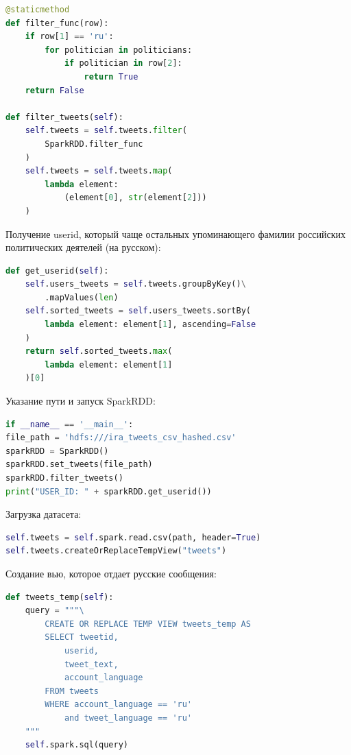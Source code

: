 \begin{lstlisting}[language={Python}, caption={Выбор сообщений}, label=lst:rdd2]
@staticmethod
def filter_func(row):
	if row[1] == 'ru':
		for politician in politicians:
			if politician in row[2]:
				return True
	return False
	
def filter_tweets(self):
	self.tweets = self.tweets.filter(
		SparkRDD.filter_func
	)
	self.tweets = self.tweets.map(
		lambda element: 
			(element[0], str(element[2]))
	)
\end{lstlisting}

Получение userid, который чаще остальных упоминающего фамилии российских политических деятелей (на русском):

\begin{lstlisting}[language={Python}, caption={Получение userid}, label=lst:rdd3]
def get_userid(self):
	self.users_tweets = self.tweets.groupByKey()\
		.mapValues(len)
	self.sorted_tweets = self.users_tweets.sortBy(
		lambda element: element[1], ascending=False
	)
	return self.sorted_tweets.max(
		lambda element: element[1]
	)[0]
\end{lstlisting}

Указание пути и запуск SparkRDD:

\begin{lstlisting}[language={Python}, caption={Получение userid}, label=lst:rdd4]
if __name__ == '__main__':
file_path = 'hdfs:///ira_tweets_csv_hashed.csv'
sparkRDD = SparkRDD()
sparkRDD.set_tweets(file_path)
sparkRDD.filter_tweets()
print("USER_ID: " + sparkRDD.get_userid())
\end{lstlisting}

Загрузка датасета:

\begin{lstlisting}[language={Python}, caption={Получение userid}, label=lst:sql1]
self.tweets = self.spark.read.csv(path, header=True)
self.tweets.createOrReplaceTempView("tweets")
\end{lstlisting}

Создание вью, которое отдает русские сообщения:

\begin{lstlisting}[language={Python}, caption={Получение вью с русскими сообщениями}, label=lst:sql2]
def tweets_temp(self):
	query = """\
		CREATE OR REPLACE TEMP VIEW tweets_temp AS
		SELECT tweetid, 
			userid, 
			tweet_text, 
			account_language
		FROM tweets 
		WHERE account_language == 'ru' 
			and tweet_language == 'ru'
	"""
	self.spark.sql(query)
\end{lstlisting}

